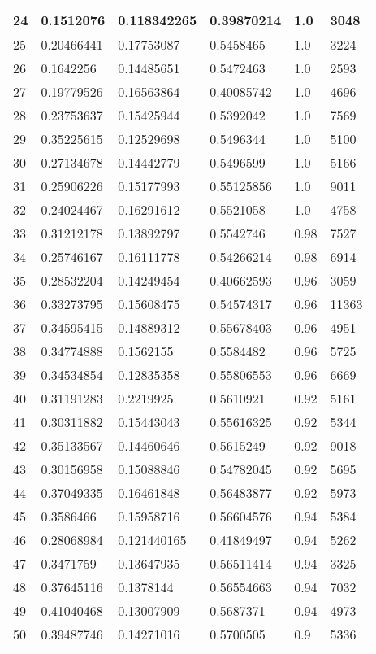 \begin{longtable}{|l|l|l|l|l|l|}
24 & 0.1512076 & 0.118342265 & 0.39870214 & 1.0 & 3048 \\ \hline 
25 & 0.20466441 & 0.17753087 & 0.5458465 & 1.0 & 3224 \\ \hline 
26 & 0.1642256 & 0.14485651 & 0.5472463 & 1.0 & 2593 \\ \hline 
27 & 0.19779526 & 0.16563864 & 0.40085742 & 1.0 & 4696 \\ \hline 
28 & 0.23753637 & 0.15425944 & 0.5392042 & 1.0 & 7569 \\ \hline 
29 & 0.35225615 & 0.12529698 & 0.5496344 & 1.0 & 5100 \\ \hline 
30 & 0.27134678 & 0.14442779 & 0.5496599 & 1.0 & 5166 \\ \hline 
31 & 0.25906226 & 0.15177993 & 0.55125856 & 1.0 & 9011 \\ \hline 
32 & 0.24024467 & 0.16291612 & 0.5521058 & 1.0 & 4758 \\ \hline 
33 & 0.31212178 & 0.13892797 & 0.5542746 & 0.98 & 7527 \\ \hline 
34 & 0.25746167 & 0.16111778 & 0.54266214 & 0.98 & 6914 \\ \hline 
35 & 0.28532204 & 0.14249454 & 0.40662593 & 0.96 & 3059 \\ \hline 
36 & 0.33273795 & 0.15608475 & 0.54574317 & 0.96 & 11363 \\ \hline 
37 & 0.34595415 & 0.14889312 & 0.55678403 & 0.96 & 4951 \\ \hline 
38 & 0.34774888 & 0.1562155 & 0.5584482 & 0.96 & 5725 \\ \hline 
39 & 0.34534854 & 0.12835358 & 0.55806553 & 0.96 & 6669 \\ \hline 
40 & 0.31191283 & 0.2219925 & 0.5610921 & 0.92 & 5161 \\ \hline 
41 & 0.30311882 & 0.15443043 & 0.55616325 & 0.92 & 5344 \\ \hline 
42 & 0.35133567 & 0.14460646 & 0.5615249 & 0.92 & 9018 \\ \hline 
43 & 0.30156958 & 0.15088846 & 0.54782045 & 0.92 & 5695 \\ \hline 
44 & 0.37049335 & 0.16461848 & 0.56483877 & 0.92 & 5973 \\ \hline 
45 & 0.3586466 & 0.15958716 & 0.56604576 & 0.94 & 5384 \\ \hline 
46 & 0.28068984 & 0.121440165 & 0.41849497 & 0.94 & 5262 \\ \hline 
47 & 0.3471759 & 0.13647935 & 0.56511414 & 0.94 & 3325 \\ \hline 
48 & 0.37645116 & 0.1378144 & 0.56554663 & 0.94 & 7032 \\ \hline 
49 & 0.41040468 & 0.13007909 & 0.5687371 & 0.94 & 4973 \\ \hline 
50 & 0.39487746 & 0.14271016 & 0.5700505 & 0.9 & 5336 \\ \hline 
\end{longtable}